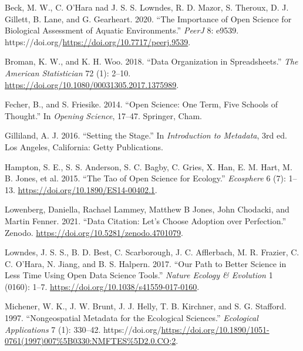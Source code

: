 \documentclass[
  letterpaper,
  DIV=11,
  numbers=noendperiod]{scrreprt}
\newlength{\cslhangindent}
\newlength{\cslentryspacingunit} %
\newenvironment{CSLReferences}[2] %
 {%
  \setlength{\parindent}{0pt}
  \ifodd #1
  \let\oldpar\par
  \def\par{\hangindent=\cslhangindent\oldpar}
  \fi
  \setlength{\parskip}{#2\cslentryspacingunit}
 }%
 {}
\begin{document}
\hypertarget{refs}{}
\begin{CSLReferences}{1}{0}
\leavevmode{}%
Beck, M. W., C. O'Hara nad J. S. S. Lowndes, R. D. Mazor, S. Theroux, D.
J. Gillett, B. Lane, and G. Gearheart. 2020. {``The Importance of Open
Science for Biological Assessment of Aquatic Environments.''}
\emph{PeerJ} 8: e9539.
https://doi.org/\url{https://doi.org/10.7717/peerj.9539}.

\leavevmode{}%
Broman, K. W., and K. H. Woo. 2018. {``Data Organization in
Spreadsheets.''} \emph{The American Statistician} 72 (1): 2--10.
\url{https://doi.org/10.1080/00031305.2017.1375989}.

\leavevmode{}%
Fecher, B., and S. Friesike. 2014. {``Open Science: One Term, Five
Schools of Thought.''} In \emph{Opening Science}, 17--47. Springer,
Cham.

\leavevmode{}%
Gilliland, A. J. 2016. {``Setting the Stage.''} In \emph{Introduction to
Metadata}, 3rd ed. Los Angeles, California: Getty Publications.

\leavevmode{}%
Hampton, S. E., S. S. Anderson, S. C. Bagby, C. Gries, X. Han, E. M.
Hart, M. B. Jones, et al. 2015. {``The Tao of Open Science for
Ecology.''} \emph{Ecosphere} 6 (7): 1--13.
\url{https://doi.org/10.1890/ES14-00402.1}.

\leavevmode{}%
Lowenberg, Daniella, Rachael Lammey, Matthew B Jones, John Chodacki, and
Martin Fenner. 2021. {``Data Citation: Let's Choose Adoption over
Perfection.''} Zenodo. \url{https://doi.org/10.5281/zenodo.4701079}.

\leavevmode{}%
Lowndes, J. S. S., B. D. Best, C. Scarborough, J. C. Afflerbach, M. R.
Frazier, C. C. O'Hara, N. Jiang, and B. S. Halpern. 2017. {``Our Path to
Better Science in Less Time Using Open Data Science Tools.''}
\emph{Nature Ecology \& Evolution} 1 (0160): 1--7.
\url{https://doi.org/10.1038/s41559-017-0160}.

\leavevmode{}%
Michener, W. K., J. W. Brunt, J. J. Helly, T. B. Kirchner, and S. G.
Stafford. 1997. {``Nongeospatial Metadata for the Ecological
Sciences.''} \emph{Ecological Applications} 7 (1): 330--42.
https://doi.org/\url{https://doi.org/10.1890/1051-0761(1997)007\%5B0330:NMFTES\%5D2.0.CO;2}.


\end{CSLReferences}
\end{document}
